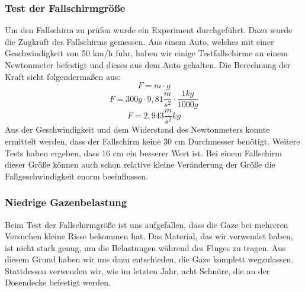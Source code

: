 \subsubsection{Test der Fallschirmgröße}
Um den Fallschirm zu prüfen wurde ein Experiment durchgeführt. Dazu wurde die Zugkraft des Fallschirms gemessen. Aus einem Auto, welches mit einer Geschwindigkeit von 50 km/h fuhr, haben wir einige Testfallschirme an einem Newtonmeter befestigt und dieses aus dem Auto gehalten. Die Berechnung der Kraft sieht folgendermaßen aus:
\[
F = m \cdot g
\]
\[
F = 300g \cdot 9,81\frac{m}{s^2} \cdot \frac{1kg}{1000g}
\]
\[
F = 2,943 \frac{m}{s^2} kg
\]
Aus der Geschwindigkeit und dem Widerstand des Newtonmeters konnte ermittelt werden, dass der Fallschirm keine 30 cm Durchmesser benötigt. Weitere Tests haben ergeben, dass 16 cm ein besserer Wert ist. Bei einem Fallschirm dieser Größe können auch schon relative kleine Veränderung der Größe die Fallgeschwindigkeit enorm beeinflussen.

\subsubsection{Niedrige Gazenbelastung}
Beim Test der Fallschirmgröße ist uns aufgefallen, dass die Gaze bei mehreren Versuchen kleine Risse bekommen hat. Das Material, das wir verwendet haben, ist nicht stark genug, um die Belastungen während des Fluges zu tragen. Aus diesem Grund haben wir uns dazu entschieden, die Gaze komplett wegzulassen. Stattdessen verwenden wir, wie im letzten Jahr, acht Schnüre, die an der Dosendecke befestigt werden.